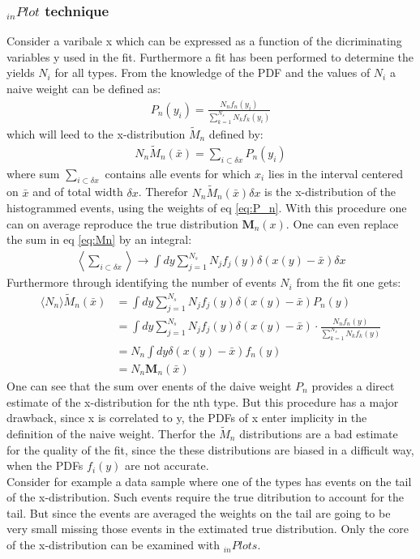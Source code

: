 \documentclass[english]{uzhpub}
\begin{document}
\subsubsection{$_{in} Plot$ technique}
Consider a varibale x which can be expressed as a function of the dicriminating variables y used in the fit. Furthermore a fit has been performed to determine the yields $N_i$ for all types. From the knowledge of the PDF and the values of $N_i$ a naive weight can be defined as:
\begin{align}
  P_n(y_i) = \frac{N_n f_n(y_i)}{\sum_{k=1}^{N_s} N_k f_k(y_i)} \label{eq:P_n}
\end{align}
which will leed to the x-distribution $\tilde{M}_n$ defined by:
\begin{align}
  N_n \tilde{M}_n (\bar{x}) = \sum_{i \subset \delta x} P_n (y_i) \label{eq:Mn}
\end{align}
where sum $\sum_{i \subset \delta x}$ contains alle events for which $x_i$ lies in the interval centered on $\bar{x}$ and of total width $\delta x$.
Therefor $N_n \tilde{M}_n (\bar{x}) \delta x$ is the x-distribution of the histogrammed events, using the weights of eq \ref{eq:P_n}.
With this procedure one can on average reproduce the true distribution $\textbf{M}_n(x)$. One can even replace the sum in eq \ref{eq:Mn} by an integral:
\begin{align}
  \left \langle \sum_{i \subset \delta x} \right \rangle \rightarrow \int dy \sum_{j=1}^{N_s} N_j f_j (y) \delta (x(y) - \bar{x}) \delta x
\end{align}
Furthermore through identifying the number of events $N_i$ from the fit one gets:
\begin{align}
  \langle N_n \rangle \tilde{M}_n (\bar{x}) & = \int dy \sum_{j=1}^{N_s} N_j f_j (y) \delta (x(y) - \bar{x}) P_n (y) \\
  & = \int dy \sum_{j=1}^{N_s} N_j f_j (y) \delta (x(y)- \bar{x}) \cdot \frac{N_n f_n (y)}{\sum_{k=1}^{N_s} N_k f_k (y)} \\
  & = N_n \int dy \delta (x(y) - \bar{x}) f_n (y) \\
  & = N_n \textbf{M}_n(\bar{x})
\end{align}
One can see that the sum over enents of the daive weight $P_n$ provides a direct estimate of the x-distribution for the nth type.
But this procedure has a major drawback, since x is correlated to y, the PDFs of x enter implicity in the definition of the naive weight. Therfor the $\tilde{M}_n$ distributions are a bad estimate for the quality of the fit, since the these distributions are biased in a difficult way, when the PDFs $f_i(y)$ are not accurate. \\
Consider for example a data sample where one of the types has events on the tail of the x-distribution. Such events require the true ditribution to account for the tail. But since the events are averaged the weights on the tail are going to be very small missing those events in the extimated true distribution. Only the core of the x-distribution can be examined with $_{in} Plots$.
\end{document}
